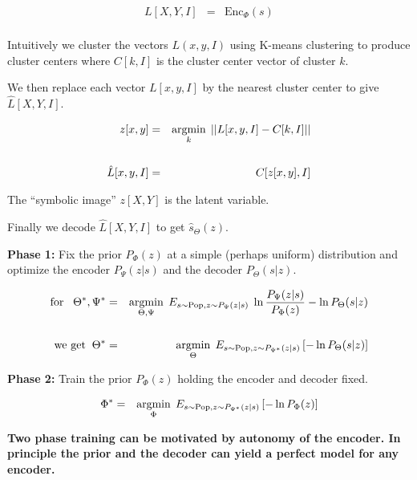 {\begin{eqnarray*}
L[X,Y,I] & = & \mathrm{Enc}_\Phi(s) \\
\end{eqnarray*}

Intuitively we cluster the vectors $L(x,y,I)$ using K-means clustering to produce cluster centers where $C[k,I]$
is the cluster center vector of cluster $k$.


We then replace each vector $L[x,y,I]$ by the nearest cluster center to give $\hat{L}[X,Y,I]$.

{\huge
\begin{eqnarray*}
z[x,y] & = & \operatorname*{argmin}_k \;||L[x,y,I] - C[k,I]|| \\
\\
\hat{L}[x,y,I] & = & C[z[x,y],I] \\
\end{eqnarray*}
}

The ``symbolic image'' $z[X,Y]$ is the latent variable.


Finally we decode $\hat{L}[X,Y,I]$ to get $\hat{s}_\Theta(z)$.


{\huge
{\bf Phase 1:} Fix the prior $P_\Phi(z)$ at a simple (perhaps uniform) distribution and optimize the encoder $P_\Psi(z|s)$ and the decoder $P_\Theta(s|z)$.

\begin{eqnarray*}
\mbox{for}\;\;\;\Theta^*,\Psi^* &  = & \operatorname*{argmin}_{\Theta,\Psi}\;E_{s\sim \mathrm{Pop},z\sim P_\Psi(z|s)}  \;\ln \frac{P_\Psi(z|s)}{P_\Phi(z)}  - \ln P_\Theta(s|z)
\\
\\
\mbox{we get}\;\;\Theta^* & = & \operatorname*{argmin}_\Theta\;E_{s \sim \mathrm{Pop},z \sim P_{\Psi^*}(z|s)}\left[-\ln P_\Theta(s|z)\right]
\end{eqnarray*}

\vfill
{\bf Phase 2:} Train the prior $P_\Phi(z)$ holding the encoder and decoder fixed.

\begin{eqnarray*}
\Phi^* &  = & \operatorname*{argmin}_{\Phi}\;E_{s\sim \mathrm{Pop},z\sim P_{\Psi^*}(z|s)}\left[-\ln P_\Phi(z)\right]
\end{eqnarray*}

\vfill
{\bf Two phase training can be motivated by autonomy of the encoder.  In principle the prior and the decoder can yield a perfect model for any encoder.}

}}
